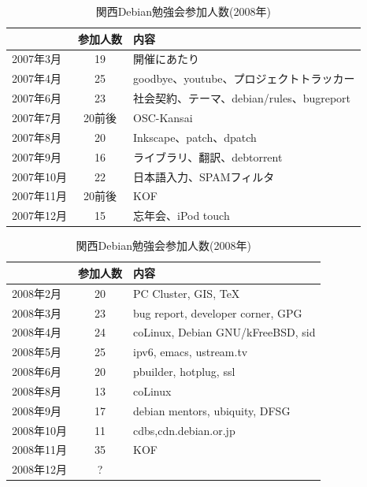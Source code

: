 \documentclass[mingoth,a4paper]{jsarticle}
\begin{document}
\begin{table}
\begin{minipage}{0.5\hsize}
 \caption{関西Debian勉強会参加人数(2007年)}\label{tab:count2007kansai}
 \begin{center}
  \begin{tabular}{|l|c|p{10em}|}
 \hline
 & 参加人数 & 内容 \\
 \hline
2007年3月 & 19 & 開催にあたり \\
2007年4月 & 25 & goodbye、youtube、プロジェクトトラッカー\\
2007年6月 & 23 & 社会契約、テーマ、debian/rules、bugreport\\
2007年7月 & 20前後 & OSC-Kansai \\
2007年8月 & 20 & Inkscape、patch、dpatch\\
2007年9月 & 16 & ライブラリ、翻訳、debtorrent\\
2007年10月 & 22& 日本語入力、SPAMフィルタ\\
2007年11月 & 20前後 & KOF \\   
2007年12月 & 15& 忘年会、iPod touch\\   
 \hline
  \end{tabular}
 \end{center}
\end{minipage}
\begin{minipage}{0.5\hsize}
 \caption{関西Debian勉強会参加人数(2008年)}\label{tab:count2008kansai}
 \begin{center}
  \begin{tabular}{|l|c|p{10em}|}
 \hline
 & 参加人数 & 内容 \\
 \hline
2008年2月 & 20 & PC Cluster, GIS, \TeX \\
2008年3月 & 23 & bug report, developer corner, GPG \\
2008年4月 & 24 & coLinux, Debian GNU/kFreeBSD, sid \\
2008年5月 & 25  & ipv6, emacs, ustream.tv\\
2008年6月 & 20  & pbuilder, hotplug, ssl\\
2008年8月 & 13  & coLinux \\
2008年9月 & 17  & debian mentors, ubiquity, DFSG\\
2008年10月 & 11  & cdbs,cdn.debian.or.jp \\
2008年11月 & 35  & KOF \\
2008年12月 & ?  & \\
 \hline
  \end{tabular}
 \end{center}
\end{minipage}
\end{table}
\end{document}

